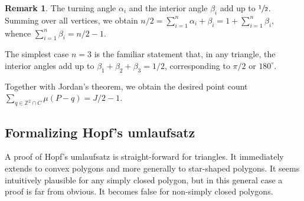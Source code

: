\documentclass[a4paper]{amsart}
\numberwithin{equation}{section}
\theoremstyle{plain}
\theoremstyle{definition}
\newtheorem{remark}[theorem]{Remark}
\newcommand{\Z}{\mathbb{Z}}
\begin{document}
\begin{remark}
  The turning angle $\alpha_i$ and the interior angle $\beta_i$
  add up to $\sfrac{1}{2}$.  Summing over all vertices, we obtain
  $n/2 = \sum_{i=1}^n \alpha_i + \beta_i = 1 + \sum_{i=1}^n \beta_i$,
  whence $\sum_{i=1}^n \beta_i = n/2 - 1$.

  The simplest case $n=3$ is the familiar statement that,
  in any triangle, the interior angles add up
  to $\beta_1 + \beta_2 + \beta_3 = 1/2$,
  corresponding to $\pi/2$ or $180^\circ$.
\end{remark}

Together with Jordan's theorem, we obtain the desired
point count $\sum_{q \in \Z^2 \cap C} \mu(P-q) = J/2 - 1$.


\subsection{Formalizing Hopf's umlaufsatz}

A proof of Hopf's umlaufsatz is straight-forward for triangles.
It immediately extends to convex polygons and
more generally to star-shaped polygons.
It seems intuitively plausible for any simply closed polygon,
but in this general case a proof is far from obvious.
It becomes false for non-simply closed polygons.
\end{document}
